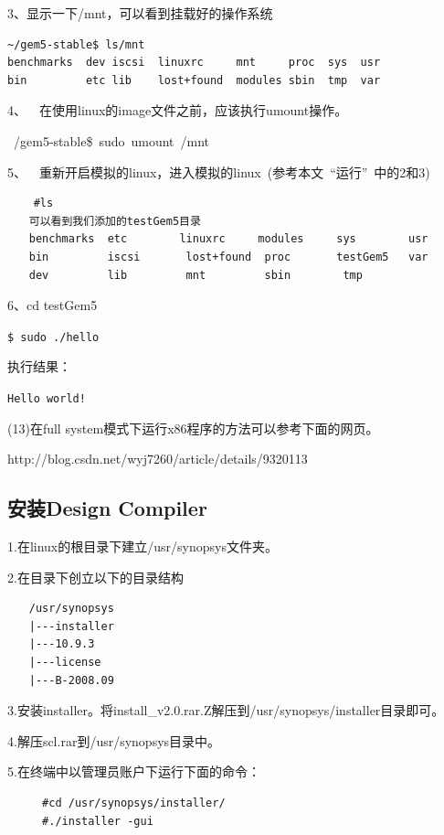 3、显示一下/mnt，可以看到挂载好的操作系统  
\begin{verbatim}
~/gem5-stable$ ls/mnt  
benchmarks  dev iscsi  linuxrc     mnt     proc  sys  usr  
bin         etc lib    lost+found  modules sbin  tmp  var  
\end{verbatim}

4、  在使用linux的image文件之前，应该执行umount操作。  

~/gem5-stable\$ sudo umount /mnt  

5、  重新开启模拟的linux，进入模拟的linux (参考本文 “运行” 中的2和3)  
\begin{verbatim}
    #ls  
　　可以看到我们添加的testGem5目录
　　benchmarks  etc        linuxrc     modules     sys        usr
　　bin         iscsi       lost+found  proc       testGem5   var
　　dev         lib         mnt         sbin        tmp
\end{verbatim}

6、cd testGem5

\verb"$ sudo ./hello"

执行结果：

\verb"Hello world!"

(13)在full system模式下运行x86程序的方法可以参考下面的网页。

http://blog.csdn.net/wyj7260/article/details/9320113

\subsection{安装Design Compiler}
1.在linux的根目录下建立/usr/synopsys文件夹。

2.在目录下创立以下的目录结构
\begin{verbatim}
　　/usr/synopsys 
　　|---installer
　　|---10.9.3
　　|---license
　　|---B-2008.09
\end{verbatim}

3.安装installer。将install\_v2.0.rar.Z解压到/usr/synopsys/installer目录即可。

4.解压scl.rar到/usr/synopsys目录中。

5.在终端中以管理员账户下运行下面的命令：
\begin{verbatim}
　　	#cd /usr/synopsys/installer/
　　	#./installer -gui
\end{verbatim}

